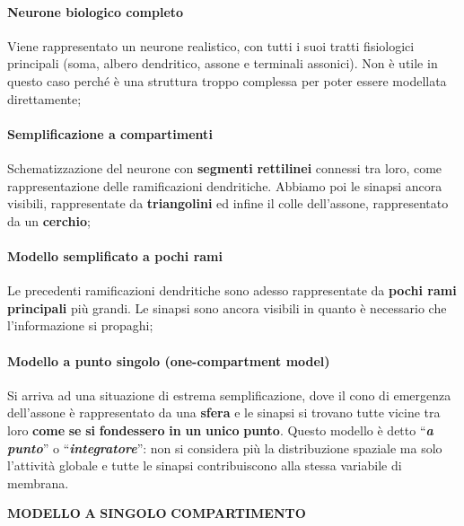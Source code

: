 \documentclass[12pt,a4paper]{book}
\begin{document}
\paragraph{Neurone biologico completo}

Viene rappresentato un neurone realistico, con tutti i suoi tratti ﬁsiologici principali (soma, albero dendritico, assone e terminali assonici). Non è utile in questo caso perché è una struttura troppo complessa per poter essere modellata direttamente;


\paragraph{Sempliﬁcazione a compartimenti}

Schematizzazione del neurone con \textbf{segmenti}\textbf{ }\textbf{rettilinei}\textbf{ }connessi tra loro, come rappresentazione delle ramiﬁcazioni dendritiche. Abbiamo poi le sinapsi ancora visibili, rappresentate da \textbf{triangolini}\textbf{ }ed inﬁne il colle dell'assone, rappresentato da un \textbf{cerchio};


\paragraph{Modello sempliﬁcato a pochi rami}

Le precedenti ramiﬁcazioni dendritiche sono adesso rappresentate da \textbf{pochi rami principali }più grandi. Le sinapsi sono ancora visibili in quanto è necessario che l'informazione si propaghi;


\paragraph{Modello a punto singolo (one-compartment model)}

Si arriva ad una situazione di estrema sempliﬁcazione, dove il cono di emergenza dell'assone è rappresentato da una \textbf{sfera}\textbf{ }e le sinapsi si trovano tutte vicine tra loro \textbf{come }\textbf{se}\textbf{ }\textbf{si}\textbf{ }\textbf{fondessero}\textbf{ }\textbf{in}\textbf{ }\textbf{un}\textbf{ }\textbf{unico}\textbf{ }\textbf{punto}. Questo modello è detto ``\textbf{\textit{a}}\textbf{\textit{ }}\textbf{\textit{punto}}'' o ``\textbf{\textit{integratore}}'': non si considera più la distribuzione spaziale ma solo l'attività globale e tutte le sinapsi contribuiscono alla stessa variabile di membrana.

\textbf{MODELLO}\textbf{ }\textbf{A}\textbf{ }\textbf{SINGOLO}\textbf{ }\textbf{COMPARTIMENTO}
\end{document}
